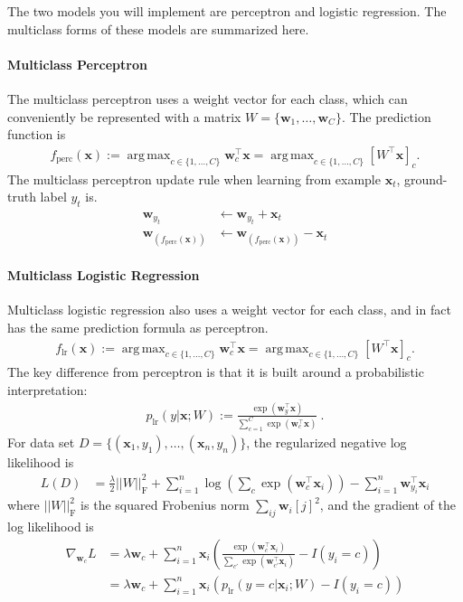 \documentclass[10pt]{article}
\newcommand{\bx}{{\boldsymbol x}}
\newcommand{\bw}{{\boldsymbol w}}
\DeclareMathOperator*{\argmax}{arg\,max}
\begin{document}
The two models you will implement are perceptron and logistic regression. The multiclass forms of these models are summarized here.

\paragraph{Multiclass Perceptron} The multiclass perceptron uses a weight vector for each class, which can conveniently be represented with a matrix $W = \{\bw_1, \ldots, \bw_C\}$. The prediction function is
\begin{align}
f_{\mathrm{perc}}(\bx) := \argmax_{c \in \{1, \ldots, C\}} \bw_c^\top \bx = \argmax_{c \in \{1, \ldots, C\}} \left[ W^\top \bx \right]_{c}.
\end{align}
The multiclass perceptron update rule when learning from example $\bx_t$, ground-truth label $y_t$ is.
\begin{align}
\bw_{y_t} &\leftarrow \bw_{y_t} + \bx_t\\
\bw_{\left(f_{\mathrm{perc}}(\bx)\right)} &\leftarrow \bw_{\left(f_{\mathrm{perc}}(\bx)\right)} - \bx_t
\end{align}

\paragraph{Multiclass Logistic Regression} Multiclass logistic regression also uses a weight vector for each class, and in fact has the same prediction formula as perceptron.
\begin{align}
f_{\mathrm{lr}}(\bx) := \argmax_{c \in \{1, \ldots, C\}} \bw_c^\top \bx = \argmax_{c \in \{1, \ldots, C\}} \left[ W^\top \bx \right]_{c}.
\end{align}
The key difference from perceptron is that it is built around a probabilistic interpretation:
\begin{align}
p_{\mathrm{lr}}(y | \bx; W) := \frac{\exp(\bw_y^\top \bx)}{\sum_{c = 1}^C \exp(\bw_c^\top \bx)} ~ .
\end{align}
For data set $D = \{(\bx_1, y_1), \ldots, (\bx_n, y_n)\}$, the regularized negative log likelihood is
\begin{align}
L(D) &= \frac{\lambda}{2} ||W||^2_{\textrm{F}} + \sum_{i=1}^n \log \left(\sum_{c} \exp(\bw_{c}^\top \bx_i)\right) - \sum_{i = 1}^n \bw_{y_i}^\top \bx_i 
\label{eq:nll}
\end{align}
where $||W||^2_{\textrm{F}}$ is the squared Frobenius norm $\sum_{ij} \bw_i[j]^2$, 
and the gradient of the log likelihood is
\begin{align}
\nabla_{\bw_c} L &= \lambda \bw_c + \sum_{i = 1}^n  \bx_i \left(\frac{\exp(\bw_{c}^\top \bx_i)}{\sum_{c'} \exp(\bw_{c'}^\top \bx_i)} - I(y_i = c) \right) \label{eq:lrgrad}
\\
 &= \lambda \bw_c + \sum_{i = 1}^n  \bx_i \left(p_{\textrm{lr}}(y = c | \bx_i; W) - I(y_i = c) \right)
 \label{eq:simplified-lrgrad}
\end{align}
\end{document}
